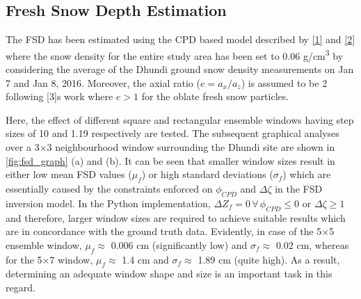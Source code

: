 \documentclass{article}
\begin{document}
\subsection{Fresh Snow Depth Estimation}
\label{ssec:fsde}
The FSD has been estimated using the CPD based model described by \eqref{1} and \eqref{2} where the snow density for the entire study area has been set to 0.06 g/cm\textsuperscript{3} by considering the average of the Dhundi ground snow density measurements on Jan 7 and Jan 8, 2016. Moreover, the axial ratio ($e=a_x/a_z$) is assumed to be  2  following [3]\textquotesingle s work where $e > 1$ for the oblate fresh snow particles.

Here, the effect of different square and rectangular ensemble windows having step sizes of 10 and 1.19 respectively are tested. The subsequent graphical analyses over a 3$\times$3 neighbourhood window surrounding the Dhundi site are shown in \ref{fig:fsd_graph}{ (a) and (b)}. It can be seen that smaller window sizes result in either low mean FSD values ($\mu_f$) or high standard deviations ($\sigma_f$) which are essentially caused by the constraints enforced on $\phi_{CPD}$ and $\Delta{\zeta}$ in the FSD inversion model. In the Python implementation, $\Delta{Z_f} = 0 \, \forall \, \phi_{CPD} \le 0 \text{ or } \Delta{\zeta} \ge 1$ and therefore, larger window sizes are required to achieve suitable results which are in concordance with the ground truth data. Evidently, in case of the 5$\times$5 ensemble window, $\mu_f \approx$ 0.006 cm (significantly low) and $\sigma_f \approx$ 0.02 cm, whereas for the 5$\times$7 window, $\mu_f \approx$ 1.4 cm and $\sigma_f \approx$ 1.89 cm (quite high). As a result, determining an adequate window shape and size is an important task in this regard.
\end{document}
